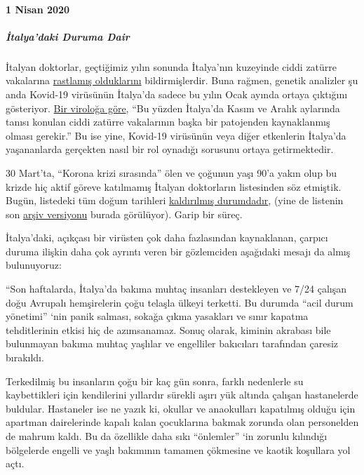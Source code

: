 \hypertarget{1-nisan-2020}{%
\paragraph{1 Nisan 2020}\label{1-nisan-2020}}

\hypertarget{italyadaki-duruma-dair}{%
\subparagraph{\texorpdfstring{\textbf{İtalya'daki Duruma
Dair}}{İtalya'daki Duruma Dair}}\label{italyadaki-duruma-dair}}

İtalyan doktorlar, geçtiğimiz yılın sonunda İtalya'nın kuzeyinde ciddi
zatürre vakalarına
\href{https://www.scmp.com/news/china/society/article/3076334/coronavirus-strange-pneumonia-seen-lombardy-november-leading}{rastlamış
olduklarını} bildirmişlerdir. Buna rağmen, genetik analizler şu anda
Kovid-19 virüsünün İtalya'da sadece bu yılın Ocak ayında ortaya
çıktığını gösteriyor.
\href{https://www.nzz.ch/wissenschaft/coronavirus-der-stammbaum-verraet-woher-es-kommt-ld.1548271}{Bir
viroloğa göre}, ``Bu yüzden İtalya'da Kasım ve Aralık aylarında tanısı
konulan ciddi zatürre vakalarının başka bir patojenden kaynaklanmış
olması gerekir.'' Bu ise yine, Kovid-19 virüsünün veya diğer etkenlerin
İtalya'da yaşananlarda gerçekten nasıl bir rol oynadığı sorusunu ortaya
getirmektedir.

30 Mart'ta, ``Korona krizi sırasında'' ölen ve çoğunun yaşı 90'a yakın
olup bu krizde hiç aktif göreve katılmamış İtalyan doktorların
listesinden söz etmiştik. Bugün, listedeki tüm doğum tarihleri
\href{https://portale.fnomceo.it/elenco-dei-medici-caduti-nel-corso-dellepidemia-di-covid-19/}{kaldırılmış
durumdadır}, (yine de listenin son
\href{https://web.archive.org/web/20200328152430/https://portale.fnomceo.it/elenco-dei-medici-caduti-nel-corso-dellepidemia-di-covid-19/}{arşiv
versiyonu} burada görülüyor). Garip bir süreç.

İtalya'daki, açıkçası bir virüsten çok daha fazlasından kaynaklanan,
çarpıcı duruma ilişkin daha çok ayrıntı veren bir gözlemciden aşağıdaki
mesajı da almış bulunuyoruz:

``Son haftalarda, İtalya'da bakıma muhtaç insanları destekleyen ve 7/24
çalışan doğu Avrupalı hemşirelerin çoğu telaşla ülkeyi terketti. Bu
durumda ``acil durum yönetimi'' `nin panik salması, sokağa çıkma
yasakları ve sınır kapatma tehditlerinin etkisi hiç de azımsanamaz.
Sonuç olarak, kiminin akrabası bile bulunmayan bakıma muhtaç yaşlılar ve
engelliler bakıcıları tarafından çaresiz bırakıldı.

Terkedilmiş bu insanların çoğu bir kaç gün sonra, farklı nedenlerle su
kaybettikleri için kendilerini yıllardır sürekli aşırı yük altında
çalışan hastanelerde buldular. Hastaneler ise ne yazık ki, okullar ve
anaokulları kapatılmış olduğu için apartman dairelerinde kapalı kalan
çocuklarına bakmak zorunda olan personelden de mahrum kaldı. Bu da
özellikle daha sıkı ``önlemler'' `in zorunlu kılındığı bölgelerde
engelli ve yaşlı bakımının tamamen çökmesine ve kaotik koşullara yol
açtı.

